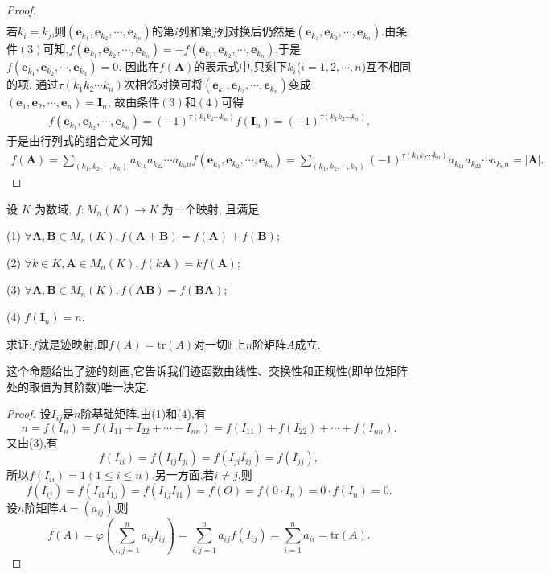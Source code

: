 \documentclass[../../main.tex]{subfiles}%
\begin{document}
\begin{proof}
\begin{align*}
\end{align*}
若\(k_i = k_j\),则\((\boldsymbol{e}_{k_1},\boldsymbol{e}_{k_2},\cdots,\boldsymbol{e}_{k_n})\)的第\(i\)列和第\(j\)列对换后仍然是\((\boldsymbol{e}_{k_1},\boldsymbol{e}_{k_2},\cdots,\boldsymbol{e}_{k_n})\).由条件\((3)\)可知,\(f(\boldsymbol{e}_{k_1},\boldsymbol{e}_{k_2},\cdots,\boldsymbol{e}_{k_n}) = -f(\boldsymbol{e}_{k_1},\boldsymbol{e}_{k_2},\cdots,\boldsymbol{e}_{k_n})\),于是\(f(\boldsymbol{e}_{k_1},\boldsymbol{e}_{k_2},\cdots,\boldsymbol{e}_{k_n}) = 0\).
因此在\(f(\boldsymbol{A})\)的表示式中,只剩下\(k_i\)(\(i = 1,2,\cdots,n\))互不相同的项.
通过\(\tau(k_1k_2\cdots k_n)\)次相邻对换可将\((\boldsymbol{e}_{k_1},\boldsymbol{e}_{k_2},\cdots,\boldsymbol{e}_{k_n})\)变成\((\boldsymbol{e}_1,\boldsymbol{e}_2,\cdots,\boldsymbol{e}_n) = \boldsymbol{I}_n\),
故由条件\((3)\)和\((4)\)可得
\begin{align*}
f(\boldsymbol{e}_{k_1},\boldsymbol{e}_{k_2},\cdots,\boldsymbol{e}_{k_n}) = (-1)^{\tau(k_1k_2\cdots k_n)}f(\boldsymbol{I}_n) = (-1)^{\tau(k_1k_2\cdots k_n)}.
\end{align*}
于是由行列式的组合定义可知
\begin{align*}
f(\boldsymbol{A}) = \sum_{(k_1,k_2,\cdots,k_n)}a_{k_11}a_{k_22}\cdots a_{k_nn}f(\boldsymbol{e}_{k_1},\boldsymbol{e}_{k_2},\cdots,\boldsymbol{e}_{k_n}) = \sum_{(k_1,k_2,\cdots,k_n)}(-1)^{\tau(k_1k_2\cdots k_n)}a_{k_11}a_{k_22}\cdots a_{k_nn} = |\boldsymbol{A}|.
\end{align*}
\end{proof}

\begin{theorem}[矩阵迹的刻画]\label{theorem:矩阵迹的刻画}
设 \( K \) 为数域, \( f: M_n(K) \to K \) 为一个映射, 且满足

(1) \( \forall \boldsymbol{A}, \boldsymbol{B} \in M_n(K), f(\boldsymbol{A} + \boldsymbol{B}) = f(\boldsymbol{A}) + f(\boldsymbol{B}) \);

(2) \( \forall k \in K, \boldsymbol{A} \in M_n(K), f(k\boldsymbol{A}) = kf(\boldsymbol{A}) \);

(3) \( \forall \boldsymbol{A}, \boldsymbol{B} \in M_n(K), f(\boldsymbol{AB}) = f(\boldsymbol{BA}) \);

(4) \( f(\boldsymbol{I}_n) = n \).

求证:\(f\)就是迹映射,即\(f(A)=\mathrm{tr}(A)\)对一切\(\mathbb{F}\)上\(n\)阶矩阵\(A\)成立.
\end{theorem}
\begin{note}
这个命题给出了迹的刻画,它告诉我们迹函数由线性、交换性和正规性(即单位矩阵处的取值为其阶数)唯一决定.
\end{note}
\begin{proof}
设\(I_{ij}\)是\(n\)阶基础矩阵.由(1)和(4),有
\[
n = f(I_n)=f(I_{11}+I_{22}+\cdots+I_{nn})=f(I_{11})+f(I_{22})+\cdots+f(I_{nn}).
\]
又由(3),有
\[
f(I_{ii})=f(I_{ij}I_{ji})=f(I_{ji}I_{ij})=f(I_{jj}),
\]
所以\(f(I_{ii}) = 1(1\leqslant  i\leqslant  n)\).另一方面,若\(i\neq j\),则
\[
f(I_{ij})=f(I_{i1}I_{1j})=f(I_{1j}I_{i1})=f(O)=f(0\cdot I_n)=0\cdot f(I_n)=0.
\]
设\(n\)阶矩阵\(A=(a_{ij})\),则
\[
f(A)=\varphi\left(\sum_{i,j = 1}^{n}a_{ij}I_{ij}\right)=\sum_{i,j = 1}^{n}a_{ij}f(I_{ij})=\sum_{i = 1}^{n}a_{ii}=\mathrm{tr}(A).
\]
\end{proof}
\end{document}
